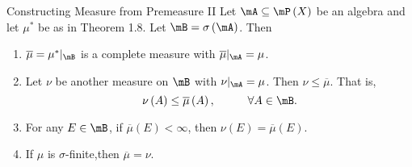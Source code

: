 \documentclass[pmath451]{subfiles}
\begin{document}
    \begin{theorem}{Constructing Measure from Premeasure II}
        Let $\mA\subseteq\mP\left( X \right)$ be an algebra and let $\mu^{*}$ be as in Theorem 1.8. Let $\mB = \sigma\left( \mA \right)$. Then
        \begin{enumerate}
            \item $\overline{\mu} = \mu^{*}|_{\mB}$ is a complete measure with $\overline{\mu}|_{\mA} = \mu$.
            \item Let $\nu$ be another measure on $\mB$ with $\nu|_{\mA} = \mu$. Then $\nu\leq\overline{\mu}$. That is,
                \begin{equation*}
                    \nu\left( A \right)\leq\overline{\mu}\left( A \right),\hspace{1cm}\forall A\in\mB.
                \end{equation*}
            \item For any $E\in\mB$, if $\overline{\mu}\left( E \right) < \infty$, then $\nu\left( E \right)=\overline{\mu}\left( E \right)$.
            \item If $\mu$ is $\sigma$-finite,\footnotemark[1] then $\overline{\mu} = \nu$.
        \end{enumerate}

        
        \noindent
        \begin{minipage}{\textwidth}
        \end{minipage}
    \end{theorem}
\end{document}
